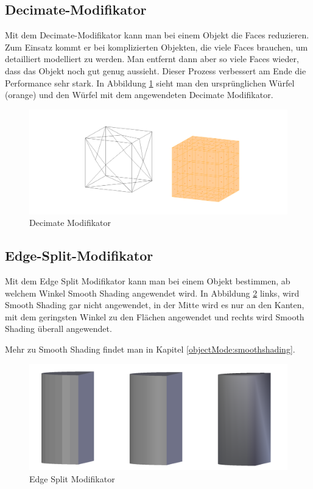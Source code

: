 \subsection{Decimate-Modifikator}\citep{blender:decimate_modifier}
\label{Decimate:heading}
Mit dem Decimate-Modifikator kann man bei einem Objekt die Faces reduzieren. Zum Einsatz kommt er bei komplizierten
Objekten, die viele Faces brauchen, um detailliert modelliert zu werden. Man entfernt dann aber so viele Faces
wieder, dass das Objekt noch gut genug aussieht. Dieser Prozess verbessert am Ende die Performance sehr stark.
In Abbildung \ref{modifikatoren:image6} sieht man den ursprünglichen Würfel (orange) und den Würfel mit dem angewendeten
Decimate Modifikator.
\begin{figure}[h]
    \centering
    \includegraphics[width=.8\textwidth]{images/Modifikatoren-Decimate.png}
    \caption{Decimate Modifikator}
    \label{modifikatoren:image6}
\end{figure}

\subsection{Edge-Split-Modifikator}\citep{blender:edgesplit_modifier}
\label{Edge_Split:heading}
Mit dem Edge Split Modifikator kann man bei einem Objekt bestimmen, ab welchem Winkel Smooth Shading angewendet wird.
In Abbildung \ref{modifikatoren:image7} links, wird Smooth Shading gar nicht angewendet, in der Mitte wird es nur an
den Kanten, mit dem geringsten Winkel zu den Flächen angewendet und rechts wird Smooth Shading überall angewendet.

Mehr zu Smooth Shading findet man in Kapitel \ref{objectMode:smoothshading}.
\begin{figure}[h]
    \centering
    \includegraphics[width=.8\textwidth]{images/Modifikatoren-Edgesplit.png}
    \caption{Edge Split Modifikator}
    \label{modifikatoren:image7}
\end{figure}